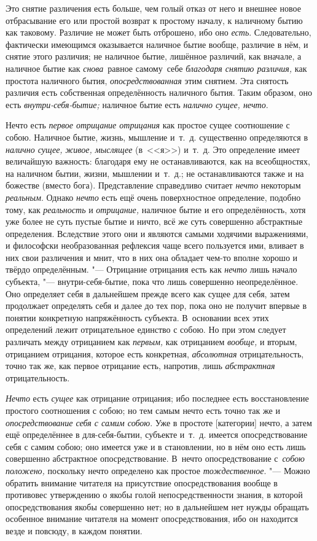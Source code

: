 Это снятие различения есть больше, чем голый отказ от него и внешнее новое
отбрасывание его или простой возврат к простому началу, к наличному бытию как
таковому. Различие не может быть отброшено, ибо оно {\em есть}. Следовательно,
фактически имеющимся оказывается наличное бытие вообще, различие в нём,
и снятие этого различия; не наличное бытие, лишённое различий, как вначале,
а наличное бытие как {\em снова}~равное самому~себе
{\em благодаря снятию различия,} как простота наличного бытия,
{\em опосредствованная} этим снятием. Эта снятость различия есть
собственная определённость наличного бытия. Таким образом, оно есть
{\em внутри-себя-бытие;} наличное бытие есть {\em налично сущее, нечто}.

Нечто есть {\em первое отрицание отрицания} как простое
сущее соотношение с собою. Наличное бытие, жизнь, мышление и~т.~д.
существенно определяются в {\em налично сущее,}
{\em живое, мыслящее} (в~<<я>>)
и~т.~д. Это определение имеет величайшую важность: благодаря ему не
останавливаются, как на всеобщностях, на наличном бытии, жизни, мышлении
и~т.~д.; не останавливаются также и на божестве (вместо бога).
Представление справедливо считает {\em нечто} некоторым
{\em реальным}. Однако {\em нечто}
есть ещё очень поверхностное определение, подобно тому, как
{\em реальность} и {\em отрицание,}
наличное бытие и его определённость, хотя уже более не суть пустые бытие и
ничто, всё же суть совершенно абстрактные определения. Вследствие этого они
и являются самыми ходячими выражениями, и философски необразованная
рефлексия чаще всего пользуется ими, вливает в них свои различения и мнит,
что в них она обладает чем-то вполне хорошо и твёрдо определённым. "---
Отрицание отрицания есть как {\em нечто} лишь начало
субъекта, "--- внутри-себя-бытие, пока что лишь совершенно неопределённое. Оно
определяет себя в дальнейшем прежде всего как сущее для себя, затем
продолжает определять себя и далее до тех пор, пока оно не получит впервые
в понятии конкретную напряжённость субъекта. В~основании всех этих
определений лежит отрицательное единство с собою. Но при этом следует
различать между отрицанием как {\em первым,} как
отрицанием {\em вообще,} и вторым, отрицанием
отрицания, которое есть конкретная, {\em абсолютная}
отрицательность, точно так же, как первое отрицание есть, напротив, лишь
{\em абстрактная} отрицательность.

{\em Нечто} есть {\em сущее} как отрицание отрицания; ибо последнее есть
восстановление простого соотношения с собою; но тем самым нечто есть точно так
же и {\em опосредствование себя с самим собою}. Уже в простоте [категории]
нечто, а затем ещё определённее в для-себя-бытии, субъекте и~т.~д. имеется
опосредствование себя с самим собою; оно имеется уже и в становлении, но в нём
оно есть лишь совершенно абстрактное опосредствование. В~нечто опосредствование
с~{\em собою положено,} поскольку нечто определено как простое
{\em тождественное}. "--- Можно обратить внимание читателя на присутствие
опосредствования вообще в противовес утверждению о якобы голой
непосредственности знания, в которой опосредствования якобы совершенно нет; но
в дальнейшем нет нужды обращать особенное внимание читателя на момент
опосредствования, ибо он находится везде и повсюду, в каждом понятии.


